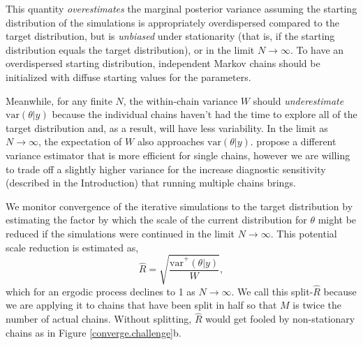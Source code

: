 \documentclass[american,]{article}
\theoremstyle{definition}
\begin{document}
This quantity \emph{overestimates} the marginal posterior variance
assuming the starting distribution of the simulations is appropriately
overdispersed compared to the target distribution, but is
\emph{unbiased} under stationarity (that is, if the starting
distribution equals the target distribution), or in the limit
\(N\rightarrow\infty\). To have an overdispersed starting distribution,
independent Markov chains should be initialized with diffuse starting
values for the parameters. 

Meanwhile, for any finite \(N\), the within-chain variance \(W\) should
\emph{underestimate} \(\mbox{var}(\theta |y)\) because the
individual chains haven't had the time to explore all of the target
distribution and, as a result, will have less variability. In the limit
as \(N\rightarrow\infty\), the expectation of \(W\) also approaches
\(\mbox{var}(\theta |y)\). \citet{vats2018revisiting} propose a different variance estimator that is more efficient for single chains, however we are willing to trade off a slightly higher variance for the increase diagnostic sensitivity (described in the Introduction) that running multiple chains brings.

We monitor convergence of the iterative simulations to the target
distribution by estimating the factor by which the scale of the current
distribution for \(\theta\) might be reduced if the simulations were
continued in the limit \(N\rightarrow\infty\). This potential scale
reduction is estimated as,
\begin{equation}
\widehat{R} = \sqrt{\frac{\widehat{\mbox{var}}^+(\theta | y)}{W}},
\end{equation}
which for an ergodic process declines to 1 as \(N\rightarrow\infty\). We call this
split-\(\widehat{R}\) because we are applying it to chains that
have been split in half so that \(M\) is twice the number of actual
chains. Without splitting, \(\widehat{R}\) would get fooled by
non-stationary chains as in Figure \ref{converge.challenge}b.

\end{document}
